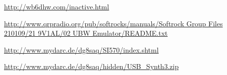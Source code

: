 \documentclass[12pt,a4paper,oneside]{article}
\begin{document}
\begin{thebibliography}{99}
\href{http://wb6dhw.com/inactive.html}{http://wb6dhw.com/inactive.html}

\href{http://www.qrpradio.org/pub/softrocks/manuals/Softrock Group Files 210109/21 9V1AL/02 UBW Emulator/README.txt}{http://www.qrpradio.org/pub/softrocks/manuals/Softrock Group Files 210109/21 9V1AL/02 UBW Emulator/README.txt}

\href{http://www.mydarc.de/dg8saq/SI570/index.shtml}{http://www.mydarc.de/dg8saq/SI570/index.shtml}

\href{ http://www.mydarc.de/dg8saq/hidden/USB\_Synth3.zip}{http://www.mydarc.de/dg8saq/hidden/USB\_Synth3.zip}

\end{thebibliography}
\end{document}
